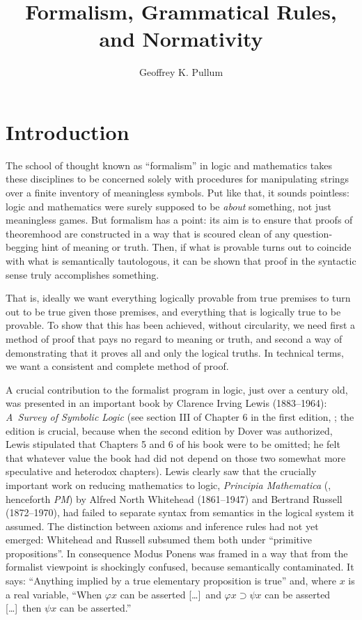 \documentclass[output=paper]{langscibook}
\author{Geoffrey K. Pullum\affiliation{University of Edinburgh}}
\title{Formalism, Grammatical Rules, and Normativity}
\begin{document}
\maketitle

\section{Introduction}
\label{sec:pullum:intro}

The school of thought known as ``formalism'' in logic and mathematics takes these disciplines to be concerned solely with procedures for manipulating strings over a finite inventory of meaningless symbols.  Put like that, it sounds pointless: logic and mathematics were surely supposed to be \emph{about} something, not just meaningless games. But formalism has a point: its aim is to ensure that proofs of theoremhood are constructed in a way that is scoured clean of any question-begging hint of meaning or truth.  Then, if what is provable turns out to coincide with what is semantically tautologous, it can be shown that proof in the syntactic sense truly accomplishes something.

That is, ideally we want everything logically provable from true premises to turn out to be true given those premises, and everything that is logically true to be provable. To show that this has been achieved, without circularity, we need first a method of proof that pays no regard to meaning or truth, and second a way of demonstrating that it proves all and only the logical truths. In technical terms, we want a consistent and complete method of proof.

A crucial contribution to the formalist program in logic, just over a century old, was presented in an important book by Clarence Irving Lewis (1883--1964): \textit{A~Survey of Symbolic Logic} (see section III of Chapter 6 in the first edition, \citeyear{Lewis18}; the edition is crucial, because when the second edition by Dover was authorized, Lewis stipulated that Chapters 5 and 6 of his book were to be omitted; he felt that whatever value the book had did not depend on those two somewhat more speculative and heterodox chapters). Lewis clearly saw that the crucially important work on reducing mathematics to logic, \textit{Principia Mathematica} (\citeyear{WhitRussPM}, henceforth \textit{PM}) by Alfred North Whitehead (1861--1947) and Bertrand Russell (1872--1970), had failed to separate syntax from semantics in the logical system it assumed. The distinction between axioms and inference rules had not yet emerged: Whitehead and Russell subsumed them both under ``primitive propositions''. In consequence Modus Ponens was framed in a way that from the formalist viewpoint is shockingly confused, because semantically contaminated. It says: ``Anything implied by a true elementary proposition is true'' and, where $x$ is a real variable, ``When $\varphi x$ can be asserted [\ldots]\ and $\varphi x \supset \psi x$ can be asserted [\ldots]\ then $\psi x$ can be asserted.''
\end{document}
